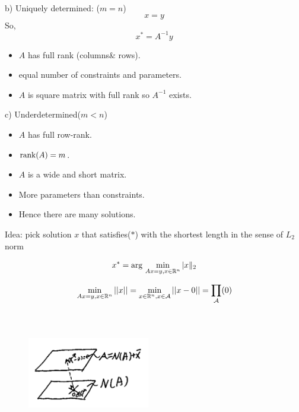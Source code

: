 b) Uniquely determined: ($m =n$)
\begin{equation*}
[A]x = y
\end{equation*}
So,
\begin{equation*}
x^* = A^{-1}y
\end{equation*}

\begin{itemize}
	\item $A$ has full rank (columns\& rows).
	
	\item equal number of constraints and parameters.
	
	\item $A$ is square matrix with full rank so $A^{-1}$ exists.
\end{itemize}

c) Underdetermined($m<n$)

\begin{itemize}
	\item $A$ has full row-rank.
	
	\item $\operatorname{rank}(A) = m$.
	 
	\item $A$ is a wide and short matrix.
	
	\item More parameters than constraints.
	
	\item Hence there are many solutions.
\end{itemize}

Idea: pick solution $x$ that satisfies($*$) with the shortest length in the sense of $L_2$ norm

\begin{equation*}
x^* = \arg \, \min_{Ax = y, x\in \mathbb{R}^n}\vert x\Vert_2
\end{equation*}

\begin{equation*}
\min_{Ax = y, x\in \mathbb{R}^n}||x|| = \min_{x\in \mathbb{R}^n, x\in \mathcal{A}}||x - 0|| = \prod_{\mathcal{A}}(0)
\end{equation*}


\begin{figure}
	\centering
	\includegraphics[width=2.1in,height=2.1in]{figures/ch06/figure3.png}
\end{figure}

